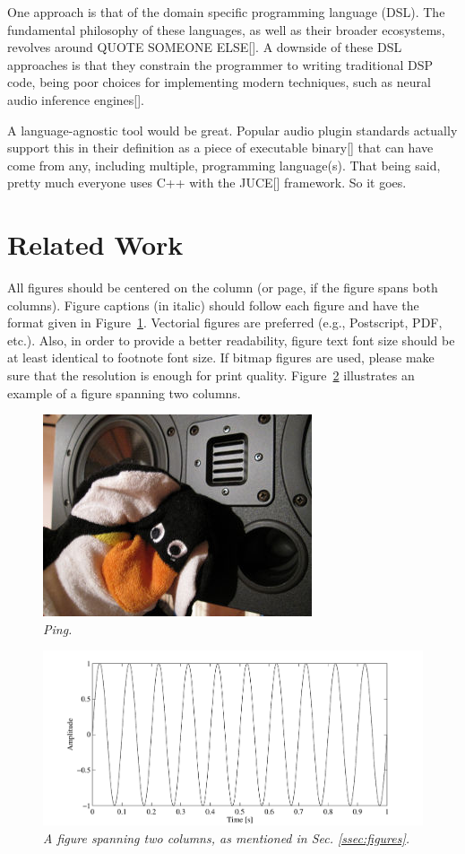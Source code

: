 \documentclass[a4paper]{article}
\begin{document}
One approach is that of the domain specific programming language (DSL). 
The fundamental philosophy of these languages, as well as their broader ecosystems, revolves around QUOTE SOMEONE ELSE[]. 
A downside of these DSL approaches is that they constrain the programmer to writing traditional DSP code, being poor choices for implementing modern techniques, such as neural audio inference engines[].

A language-agnostic tool would be great. Popular audio plugin standards actually support this in their definition as a piece of executable binary[] that can have come from any, including multiple, programming language(s).
That being said, pretty much everyone uses C++ with the JUCE[] framework. So it goes.

\section{Related Work}
\label{ssec:Related Work}

All figures should be centered on the column (or page, if the figure spans both
columns). Figure captions (in italic) should follow each figure and have the
format given in Figure~\ref{fft_plot}. Vectorial figures are preferred (e.g.,
Postscript, PDF, etc.). Also, in order to provide a better readability, figure
text font size should be at least identical to footnote font size. If bitmap
figures are used, please make sure that the resolution is enough for print
quality. Figure~\ref{ftt_plot2} illustrates an example of a figure spanning two
columns.

\begin{figure}[ht]
\centerline{\includegraphics[scale=0.5]{figures/ping}}
\caption{\label{fft_plot}{\it Ping.}}
\end{figure}

\begin{figure}[ht]
\center
\includegraphics[width=5in]{figures/TwoColumnSine2/TwoColumnSine2}
\caption{\label{ftt_plot2}{\it A figure spanning two columns, as mentioned in
Sec. \ref{ssec:figures}.}}
\end{figure}
\end{document}
